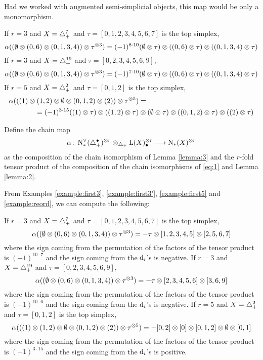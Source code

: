 \begin{remark}
	Had we worked with augmented semi-simplicial objects, this map would be only a monomorphism.
\end{remark}
\begin{example}\label{example:reord} If $r=3$ and $X=\triangle_{+}^7$ and $\tau = [0,1,2,3,4,5,6,7]$ is the top simplex,
\[
		\alpha((\emptyset \otimes (0,6) \otimes (0,1,3,4)) \otimes \tau^{\otimes 3}) = (-1)^{8\cdot 10}(\emptyset \otimes \tau) \otimes ((0,6) \otimes \tau) \otimes ((0,1,3,4) \otimes \tau)
	\]
 If $r=3$ and $X=\triangle_{+}^{19}$ and $\tau = [0,2,3,4,5,6,9]$,
\[
		\alpha((\emptyset \otimes (0,6) \otimes (0,1,3,4)) \otimes \tau^{\otimes 3}) = (-1)^{7\cdot 10}(\emptyset \otimes \tau) \otimes ((0,6) \otimes \tau) \otimes ((0,1,3,4) \otimes \tau)
	\]
 If $r=5$ and $X=\triangle_{+}^2$ and $\tau = [0,1,2]$ is the top simplex,
	\[
	\begin{split}
		\alpha(((1) \otimes (1,2) \otimes \emptyset \otimes (0,1,2) \otimes (2)) \otimes \tau^{\otimes 5}) &=
		\\
		=(-1)^{3\cdot 15}((1) \otimes \tau) \otimes ((1,2) \otimes \tau)& \otimes (\emptyset \otimes \tau) \otimes ((0,1,2) \otimes \tau) \otimes ((2) \otimes \tau)
		\end{split}
	\]
	\end{example}

\begin{definition} Define the chain map
	\[\alpha \colon \operatorname{N}^\vee_{*}(\triangle_{+}^\bullet)^{\otimes r} \otimes_{\triangle_{+}} \operatorname{L}(X)_\bullet^{\otimes r} \longrightarrow \operatorname{N}_{*}(X)^{\otimes r}\]
as the composition of the chain isomorphism of Lemma \ref{lemma:3} and the $r$-fold tensor product of the composition of the chain isomorphisms of \eqref{eq:1} and Lemma \ref{lemma:2}.
\end{definition}


From Examples \ref{example:first3}, \ref{example:first3'}, \ref{example:first5} and \ref{example:reord}, we can compute the following:
\begin{example}\label{example:alpha} If $r=3$ and $X=\triangle_{+}^7$ and $\tau = [0,1,2,3,4,5,6,7]$ is the top simplex,
\[
		\alpha((\emptyset \otimes (0,6) \otimes (0,1,3,4)) \otimes \tau^{\otimes 3}) = -\tau \otimes [1,2,3,4,5] \otimes [2,5,6,7]
	\]
	where the sign coming from the permutation of the factors of the tensor product is $(-1)^{10\cdot 7}$ and the sign coming from the $\operatorname{d}_i$'s is negative. If $r=3$ and $X=\triangle_{+}^{19}$ and $\tau = [0,2,3,4,5,6,9]$,
\[
		\alpha((\emptyset \otimes (0,6) \otimes (0,1,3,4)) \otimes \tau^{\otimes 3}) = -\tau \otimes [2,3,4,5,6] \otimes [3,6,9]
	\]
	where the sign coming from the permutation of the factors of the tensor product is $(-1)^{10\cdot 6}$ and the sign coming from the $\operatorname{d}_i$'s is negative. If $r=5$ and $X=\triangle_{+}^2$ and $\tau = [0,1,2]$ is the top simplex,
	\[
		\alpha(((1) \otimes (1,2) \otimes \emptyset \otimes (0,1,2) \otimes (2)) \otimes \tau^{\otimes 5}) = -[0,2] \otimes [0] \otimes [0,1,2] \otimes \emptyset \otimes [0,1]
	\]
		where the sign coming from the permutation of the factors of the tensor product is $(-1)^{3\cdot 15}$ and the sign coming from the $\operatorname{d}_i$'s is positive.
	\end{example}
